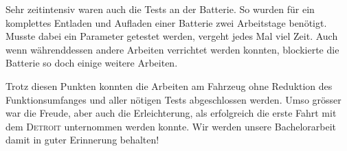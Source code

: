 Sehr zeitintensiv waren auch die Tests an der Batterie. So wurden für ein komplettes Entladen und Aufladen einer Batterie zwei Arbeitstage benötigt. Musste dabei ein Parameter getestet werden, vergeht jedes Mal viel Zeit. Auch wenn währenddessen andere Arbeiten verrichtet werden konnten, blockierte die Batterie so doch einige weitere Arbeiten.

Trotz diesen Punkten konnten die Arbeiten am Fahrzeug ohne Reduktion des Funktionsumfanges und aller nötigen Tests abgeschlossen werden. Umso grösser war die Freude, aber auch die Erleichterung, als erfolgreich die erste Fahrt mit dem \textsc{Detroit} unternommen werden konnte. Wir werden unsere Bachelorarbeit damit in guter Erinnerung behalten!